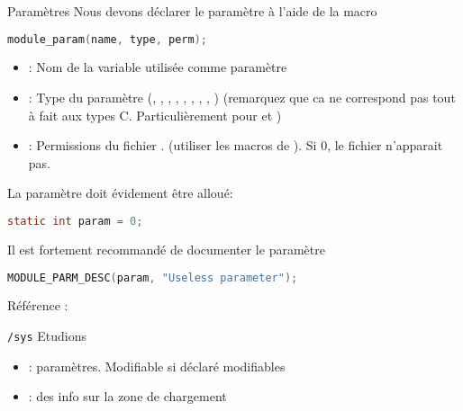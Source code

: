 \begin{frame}[fragile=singleslide]{Paramètres}
  Nous   devons  déclarer   le  paramètre   à  l'aide   de   la  macro
  \begin{lstlisting}[language=c]
module_param(name, type, perm);
  \end{lstlisting} 
  \begin{itemize} 
  \item {}: Nom de la variable utilisée comme paramètre
  \item  {}:  Type   du  paramètre  (,  ,
    ,  ,   ,  ,  ,
    , ) (remarquez que  ca ne correspond pas tout
    à  fait   aux  types   C.  Particulièrement  pour     et
    )
  \item        {}:        Permissions        du        fichier
    .    (utiliser   les
    macros de ). Si 0, le fichier n'apparait pas.
  \end{itemize}
  La paramètre doit évidement être alloué:
  \begin{lstlisting}[language=c]
static int param = 0;
  \end{lstlisting} 
  Il est fortement recommandé de documenter le paramètre
  \begin{lstlisting}[language=c]
MODULE_PARM_DESC(param, "Useless parameter");
  \end{lstlisting} 
  Référence : 
\end{frame}

\begin{frame}[fragile=singleslide]{\texttt{/sys}}
  Etudions 
  \begin{itemize}
  \item                       {}:
    paramètres. Modifiable si déclaré modifiables
  \item {}:  des info sur  la zone
    de chargement
  \end{itemize}
\end{frame}

